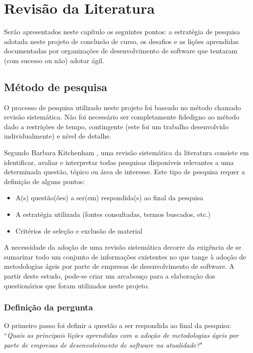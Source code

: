 \chapter{Revisão da Literatura}
	Serão apresentados neste capítulo os seguintes pontos: a estratégia de pesquisa adotada neste projeto de conclusão de curso, os desafios e as lições aprendidas documentadas por organizações de desenvolvimento de software que tentaram (com sucesso ou não) adotar ágil.
	\section{Método de pesquisa}
		O processo de pesquisa utilizado neste projeto foi baseado no método chamado revisão sistemática. Não foi necessário ser completamente fidedigno ao método dado a restrições de tempo, contingente (este foi um trabalho desenvolvido individualmente) e nível de detalhe.
		
		Segundo Barbara Kitchenham \cite{Barbara04}, uma revisão sistemática da literatura consiste em identificar, avaliar e interpretar todas pesquisas disponíveis relevantes a uma determinada questão, tópico ou área de interesse. Este tipo de pesquisa requer a definição de alguns pontos:
		\begin{itemize}
			\item A(s) questão(ões) a ser(em) respondida(s) ao final da pesquisa
			\item A estratégia utilizada (fontes consultadas, termos buscados, etc.)
			\item Critérios de seleção e exclusão de material
		\end{itemize}
		A necessidade da adoção de uma revisão sistemática decorre da exigência de se sumarizar todo um conjunto de informações existentes no que tange à adoção de metodologias ágeis por parte de empresas de desenvolvimento de software. A partir deste estudo, pode-se criar um arcabouço para a elaboração dos questionários que foram utilizados neste projeto.
		\subsection{Definição da pergunta}
			O primeiro passo foi definir a questão a ser respondida ao final da pesquisa: ``\textit{Quais as principais lições aprendidas com a adoção de metodologias ágeis por parte de empresas de desenvolvimento de software na atualidade?}"
